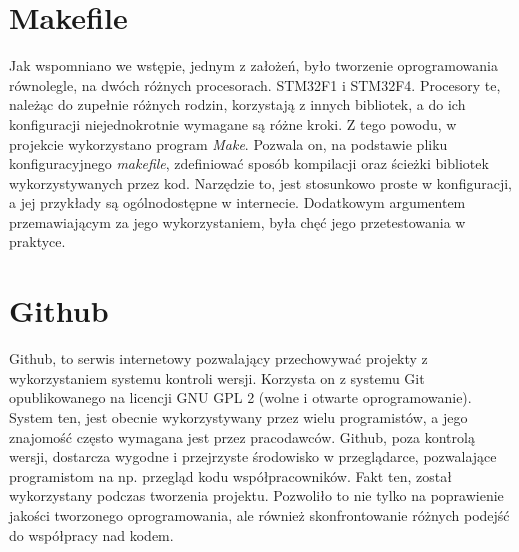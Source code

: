 \section{Makefile}
Jak wspomniano we wstępie, jednym z założeń, było tworzenie oprogramowania równolegle, na dwóch różnych procesorach. STM32F1 i STM32F4. Procesory te, należąc do zupełnie różnych rodzin, korzystają z innych bibliotek, a do ich konfiguracji niejednokrotnie wymagane są różne kroki. Z tego powodu, w projekcie wykorzystano program \emph{Make}. Pozwala on, na podstawie pliku konfiguracyjnego \emph{makefile}, zdefiniować sposób kompilacji oraz ścieżki bibliotek wykorzystywanych przez kod. Narzędzie to, jest stosunkowo proste w konfiguracji, a jej przykłady są ogólnodostępne w internecie. Dodatkowym argumentem przemawiającym za jego wykorzystaniem, była chęć jego przetestowania w praktyce.

\section{Github}
Github, to serwis internetowy pozwalający przechowywać projekty z wykorzystaniem systemu kontroli wersji. Korzysta on z systemu Git opublikowanego na licencji GNU GPL 2 (wolne i otwarte oprogramowanie). System ten, jest obecnie wykorzystywany przez wielu programistów, a jego znajomość często wymagana jest przez pracodawców. Github, poza kontrolą wersji, dostarcza wygodne i przejrzyste środowisko w przeglądarce, pozwalające programistom na np. przegląd kodu współpracowników. Fakt ten, został wykorzystany podczas tworzenia projektu. Pozwoliło to nie tylko na poprawienie jakości tworzonego oprogramowania, ale również skonfrontowanie różnych podejść do współpracy nad kodem.

